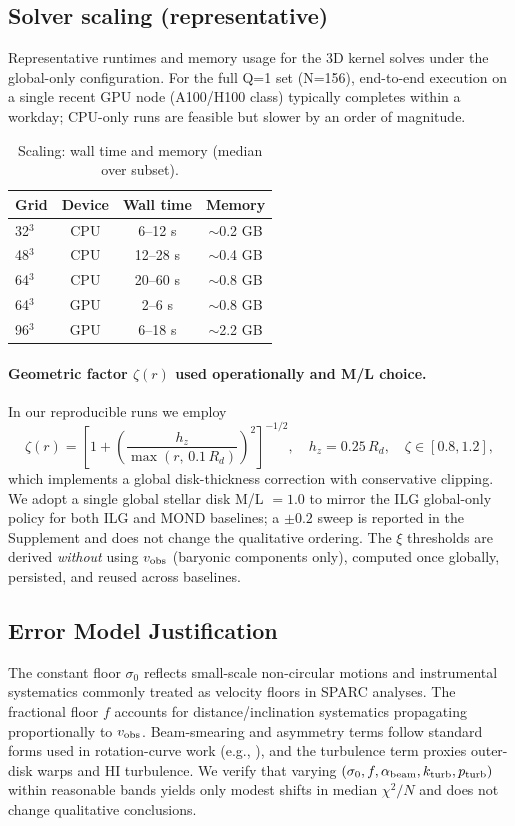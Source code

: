 \documentclass[fleqn,usenatbib]{mnras}
\begin{document}
\subsection{Solver scaling (representative)}
\noindent Representative runtimes and memory usage for the 3D kernel solves under the global-only configuration. For the full Q=1 set (N=156), end-to-end execution on a single recent GPU node (A100/H100 class) typically completes within a workday; CPU-only runs are feasible but slower by an order of magnitude.

\begin{table}[h]
\centering
\caption{Scaling: wall time and memory (median over subset).}
\label{tab:scaling}
\begin{tabular}{l c c c}
\toprule
Grid & Device & Wall time & Memory \\
\midrule
32$^3$ & CPU & 6--12 s & $\sim$0.2 GB \\
48$^3$ & CPU & 12--28 s & $\sim$0.4 GB \\
64$^3$ & CPU & 20--60 s & $\sim$0.8 GB \\
64$^3$ & GPU & 2--6 s & $\sim$0.8 GB \\
96$^3$ & GPU & 6--18 s & $\sim$2.2 GB \\
\bottomrule
\end{tabular}
\end{table}

\paragraph{Geometric factor $\zeta(r)$ used operationally and M/L choice.} In our reproducible runs we employ
\begin{equation}
\zeta(r) = \left[1 + \left( \frac{h_z}{\max(r,\,0.1\,R_d)} \right)^2 \right]^{-1/2},\quad h_z = 0.25\,R_d,\quad \zeta\in[0.8,1.2],
\end{equation}
which implements a global disk-thickness correction with conservative clipping. We adopt a single global stellar disk M/L $=1.0$ to mirror the ILG global-only policy for both ILG and MOND baselines; a \(\pm 0.2\) sweep is reported in the Supplement and does not change the qualitative ordering. The $\xi$ thresholds are derived \emph{without} using $v_{\rm obs}$ (baryonic components only), computed once globally, persisted, and reused across baselines.

\subsection{Error Model Justification}
\noindent The constant floor $\sigma_0$ reflects small-scale non-circular motions and instrumental systematics commonly treated as velocity floors in SPARC analyses. The fractional floor $f$ accounts for distance/inclination systematics propagating proportionally to $v_{\rm obs}$. Beam-smearing and asymmetry terms follow standard forms used in rotation-curve work (e.g., \citealp{lelli2016sparc,mcgaugh2016}), and the turbulence term proxies outer-disk warps and HI turbulence. We verify that varying $(\sigma_0,f,\alpha_{\rm beam},k_{\rm turb},p_{\rm turb})$ within reasonable bands yields only modest shifts in median $\chi^2/N$ and does not change qualitative conclusions.
\end{document}
